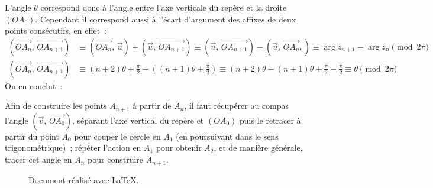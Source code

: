 \documentclass{article}
\begin{document}
L'angle $\theta$ correspond donc à l'angle entre l'axe verticale du repère et la droite $(O\!A_0)$. Cependant il correspond aussi à l'écart d'argument des affixes de deux points consécutifs, en effet~:
\begin{align*}
 \left(\overrightarrow{O\!A_n},\,\overrightarrow{O\!A_{n+1}}\right)&\equiv \left(\overrightarrow{O\!A_n},\,\vec u\right) + \left(\vec u,\,\overrightarrow{O\!A_{n+1}}\right) \equiv \left(\vec u,\,\overrightarrow{O\!A_{n+1}}\right) - \left(\vec u,\,\overrightarrow{O\!A_n},\right) \equiv \arg z_{n+1} -\arg z_n \pmod{2\pi} \\
 \left(\overrightarrow{O\!A_n},\,\overrightarrow{O\!A_{n+1}}\right)&\equiv (n+2)\theta+\frac{\pi}{2} -\left((n+1)\theta+\frac{\pi}{2}\right) \equiv (n+2)\theta - (n+1)\theta + \frac{\pi}{2} -\frac{\pi}{2}\equiv\theta\pmod{2\pi}
\end{align*}
On en conclut~:

Afin de construire les points $A_{n+1}$ à partir de $A_n$, il faut récupérer au compas l'angle $\left(\vec v,\,\overrightarrow{O\!A_0}\right)$, séparant l'axe vertical du repère et $(O\!A_0)$ puis le retracer à partir du point $A_0$ pour couper le cercle en $A_1$ (en poursuivant dans le sens trigonométrique)~; répéter l'action en $A_1$ pour obtenir $A_2$, et de manière générale, tracer cet angle en $A_n$ pour construire $A_{n+1}$.

\begin{figure}[b]
 \begin{center}
  Document réalisé avec \LaTeX.
 \end{center}
\end{figure}
\end{document}
